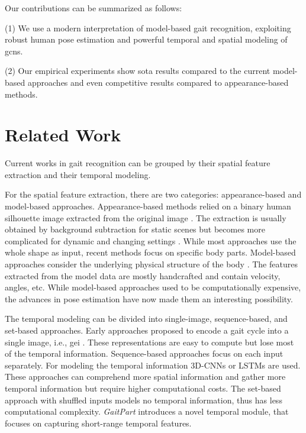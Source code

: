 \documentclass{article}
\begin{document}
Our contributions can be summarized as follows:

(1) We use a modern interpretation of model-based gait recognition, exploiting robust human pose estimation and powerful temporal and spatial modeling of \glspl{gcn}.

(2) Our empirical experiments show \gls{sota} results compared to the current model-based approaches and even competitive results compared to appearance-based methods.


\section{Related Work}
Current works in gait recognition can be grouped by their spatial feature extraction and their temporal modeling.
 
For the spatial feature extraction, there are two categories: appearance-based and model-based approaches.
Appearance-based methods relied on a binary human silhouette image extracted from the original image \cite{wang2003silhouette}. The extraction is usually obtained by background subtraction for static scenes but becomes more complicated for dynamic and changing settings \cite{song2019gaitnet}. While most approaches \cite{chao2019gaitset, wu2016comprehensive, song2019gaitnet} use the whole shape as input, recent methods \cite{fan2020gaitpart} focus on specific body parts.
Model-based approaches consider the underlying physical structure of the body \cite{bouchrika2007model, liao2017pose, liao2020model}. The features extracted from the model data are mostly handcrafted and contain velocity, angles, etc. While model-based approaches used to be computationally expensive, the advances in pose estimation have now made them an interesting possibility.

The temporal modeling can be divided into single-image, sequence-based, and set-based approaches. Early approaches proposed to encode a gait cycle into a single image, i.e., \gls{gei} \cite{han2005individual}. These representations are easy to compute but lose most of the temporal information. Sequence-based approaches focus on each input separately. For modeling the temporal information 3D-CNNs \cite{wolf2016multi, liao2017pose} or LSTMs \cite{sokolova2018pose, liao2020model} are used. These approaches can comprehend more spatial information and gather more temporal information but require higher computational costs. The set-based approach \cite{chao2019gaitset} with shuffled inputs models no temporal information, thus has less computational complexity. \textit{GaitPart} \cite{fan2020gaitpart} introduces a novel temporal module, that focuses on capturing short-range temporal features.
\end{document}
